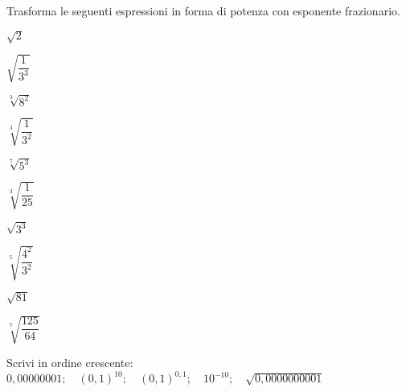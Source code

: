 \begin{esercizio}[\Ast]
 \label{ese:2.18}
Trasforma le seguenti espressioni in forma di potenza con esponente 
frazionario.
\vspace{-.5em}
 \begin{multicols}{5}
 \begin{enumeratea}
 \item \(\sqrt 2\)
 \item \(\sqrt{\dfrac {1}{3^3}}\)
 \item \(\sqrt[3]{8^2}\)
 \item \(\sqrt[3]{\dfrac {1}{3^2}}\)
 \item \(\sqrt[7]{5^3}\)
 \item \(\sqrt[3]{\dfrac {1}{25}}\)
 \item \(\sqrt{3^3}\)
 \item \(\sqrt[5]{\dfrac{4^2}{3^2}}\)
 \item \(\sqrt{81}\)
 \item \(\sqrt[7]{\dfrac {125}{64}}\)
 \end{enumeratea}
 \end{multicols}
\end{esercizio}


% 


\begin{esercizio}
 \label{ese:2.20}
Scrivi in ordine crescente:
 \(0,00000001;\quad (0,1)^{10};\quad (0,1)^{0,1};\quad 10^{-10};
 \quad \sqrt{0,0000000001}\)
\end{esercizio}

